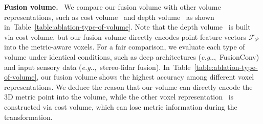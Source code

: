 \documentclass[letterpaper, 10 pt, conference]{ieeeconf}
\makeatletter
\DeclareRobustCommand\onedot{\futurelet\@let@token\@onedot}
\def\@onedot{\ifx\@let@token.\else.\null\fi\xspace}
\def\eg{\emph{e.g}\onedot} \def\Eg{{E.g}\onedot}
\newcommand{\Tref}[1]{Table~\textcolor{blue}{\ref{#1}}}
\makeatother
\begin{document}
\noindent \textbf{Fusion volume.} \
We compare our fusion volume with other volume representations, such as cost volume~\cite{gcnet} and depth volume~\cite{pseudo-lidar++} as shown in~\Tref{table:ablation-type-of-volume}. Note that the depth volume~\cite{pseudo-lidar++} is built via cost volume, but our fusion volume directly encodes point feature vectors $\mathcal{F}_{\mathcal{P}}$ into the metric-aware voxels. For a fair comparison, we evaluate each type of volume under identical conditions, such as deep architectures (\eg,~FusionConv) and input sensory data (\eg,~stereo-lidar fusion). In~\Tref{table:ablation-type-of-volume}, our fusion volume shows the highest accuracy among different voxel representations. We deduce the reason that our volume can directly encode the 3D metric point into the volume, while the other voxel representation~\cite{pseudo-lidar++} is constructed via cost volume, which can lose metric information during the transformation.
\end{document}
